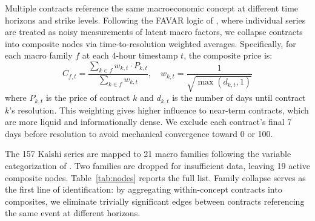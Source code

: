 \documentclass[12pt,letterpaper]{article}
\begin{document}
Multiple contracts reference the same macroeconomic concept at different time horizons and strike levels. Following the FAVAR logic of \citet{bernanke2005measuring}, where individual series are treated as noisy measurements of latent macro factors, we collapse contracts into composite nodes via time-to-resolution weighted averages. Specifically, for each macro family $f$ at each 4-hour timestamp $t$, the composite price is:
\begin{equation}
C_{f,t} = \frac{\sum_{k \in f} w_{k,t} \cdot P_{k,t}}{\sum_{k \in f} w_{k,t}}, \quad w_{k,t} = \frac{1}{\sqrt{\max(d_{k,t}, 1)}}
\end{equation}
where $P_{k,t}$ is the price of contract $k$ and $d_{k,t}$ is the number of days until contract $k$'s resolution. This weighting gives higher influence to near-term contracts, which are more liquid and informationally dense. We exclude each contract's final 7 days before resolution to avoid mechanical convergence toward 0 or 100.

The 157 Kalshi series are mapped to 21 macro families following the variable categorization of \citet{stock2016dynamic}. Two families are dropped for insufficient data, leaving 19 active composite nodes. Table~\ref{tab:nodes} reports the full list. Family collapse serves as the first line of identification: by aggregating within-concept contracts into composites, we eliminate trivially significant edges between contracts referencing the same event at different horizons.
\end{document}
